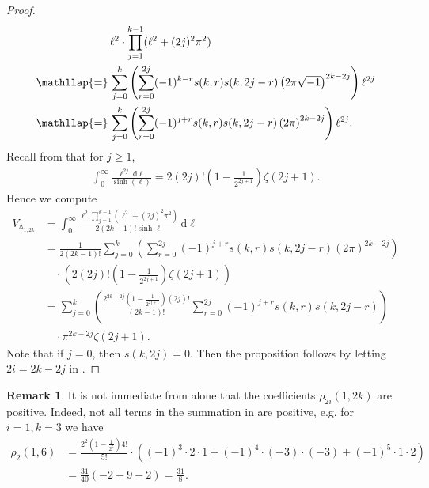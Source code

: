 \documentclass{amsart}
\theoremstyle{definition}
\newtheorem{remark}[proposition]{Remark}
\begin{document}
\begin{proof}
\[
\begin{aligned}
&\ell^2\cdot\prod_{j=1}^{k-1} (\ell^2+(2j)^2\pi^2) \\
\smash{\mathllap{=}}\, &\sum_{j=0}^{k} \left( \sum_{r=0}^{2j}(-1)^{k-r} s(k,r)s(k,2j-r)\left(2\pi\sqrt{-1}\right)^{2k-2j} \right)  \ell^{2j}\\
\smash{\mathllap{=}}\, & \sum_{j=0}^{k} \left( \sum_{r=0}^{2j}(-1)^{j+r} s(k,r)s(k,2j-r)\left(2\pi\right)^{2k-2j} \right)  \ell^{2j}.
\end{aligned}
\]
Recall from  that for $j\geqslant1$,
\begin{align}
\int_0^\infty
\frac{\ell^{2j}\;\mathrm{d}\ell}{\sinh(\ell)}
= 2(2j)!\left(1-\frac{1}{2^{2j+1}}\right)\zeta(2j+1). 
\end{align}
Hence we compute
\begin{equation}
\label{eq:vol-1-2k-annulus-sum}
\begin{split}
V_{\mathbb{A}_{1,2k}} 
&= \int_0^\infty \frac{\ell^2 \prod_{j=1}^{k-1} (\ell^2+(2j)^2\pi^2)}{2(2k-1)!\sinh \ell } \,\mathrm{d}\ell
\\&
= \frac{1}{2(2k-1)!} \sum_{j=0}^{k} \left( \sum_{r=0}^{2j}(-1)^{j+r} s(k,r)s(k,2j-r)\left(2\pi\right)^{2k-2j} \right)  
\\&
\quad\cdot \left(2(2j)!\left(1-\frac{1}{2^{2j+1}}\right)\zeta(2j+1)\right) 
\\&
=\sum_{j=0}^{k}\left(  \frac{2^{2k-2j}\left(1-\frac{1}{2^{2j+1}}\right)(2j)!}{(2k-1)!} \sum_{r=0}^{2j}(-1)^{j+r} s(k,r)s(k,2j-r)\right)
\\&
\quad\cdot\pi^{2k-2j}\zeta(2j+1).
\end{split}
\end{equation}
Note that if $j=0$, then $s(k,2j)=0$. Then the proposition follows by letting $2i=2k-2j$ in .

    
\end{proof}

\begin{remark} 
It is not immediate from  alone that the coefficients $\rho_{2i}(1,2k)$ are positive. Indeed, not all terms in the summation in  are positive, e.g. for $i=1,k=3$ we have
\begin{equation*}
\begin{split}
\rho_{2}(1,6) &= \frac{2^2(1-\frac{1}{2^5})4!}{5!}\cdot \left((-1)^{3}\cdot2\cdot1+(-1)^{4}\cdot(-3)\cdot(-3)+(-1)^{5}\cdot1\cdot2\right) \\&
=\frac{31}{40} (-2+9-2) = \frac{31}{8}.     
\end{split}    
\end{equation*}
\end{remark}
\end{document}
